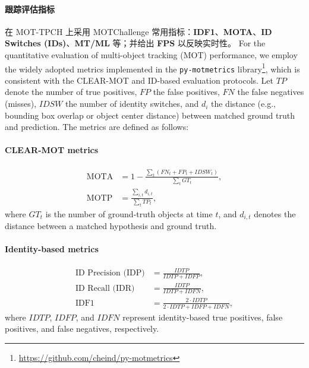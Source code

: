 \paragraph{跟踪评估指标} 在 MOT-TPCH 上采用 MOTChallenge 常用指标：\textbf{IDF1}、\textbf{MOTA}、\textbf{ID Switches (IDs)}、\textbf{MT/ML} 等；并给出 \textbf{FPS} 以反映实时性。
For the quantitative evaluation of multi-object tracking (MOT) performance, we employ the widely adopted metrics implemented in the \texttt{py-motmetrics} library\footnote{\url{https://github.com/cheind/py-motmetrics}}, which is consistent with the CLEAR-MOT and ID-based evaluation protocols. Let $TP$ denote the number of true positives, $FP$ the false positives, $FN$ the false negatives (misses), $IDSW$ the number of identity switches, and $d_i$ the distance (e.g., bounding box overlap or object center distance) between matched ground truth and prediction. The metrics are defined as follows:

\paragraph{CLEAR-MOT metrics}
\begin{align}
\text{MOTA} &= 1 - \frac{\sum_t (FN_t + FP_t + IDSW_t)}{\sum_t GT_t}, \\
\text{MOTP} &= \frac{\sum_{i,t} d_{i,t}}{\sum_t TP_t},
\end{align}
where $GT_t$ is the number of ground-truth objects at time $t$, and $d_{i,t}$ denotes the distance between a matched hypothesis and ground truth.

\paragraph{Identity-based metrics}
\begin{align}
\text{ID Precision (IDP)} &= \frac{IDTP}{IDTP + IDFP}, \\
\text{ID Recall (IDR)} &= \frac{IDTP}{IDTP + IDFN}, \\
\text{IDF1} &= \frac{2 \cdot IDTP}{2 \cdot IDTP + IDFP + IDFN},
\end{align}
where $IDTP$, $IDFP$, and $IDFN$ represent identity-based true positives, false positives, and false negatives, respectively.

